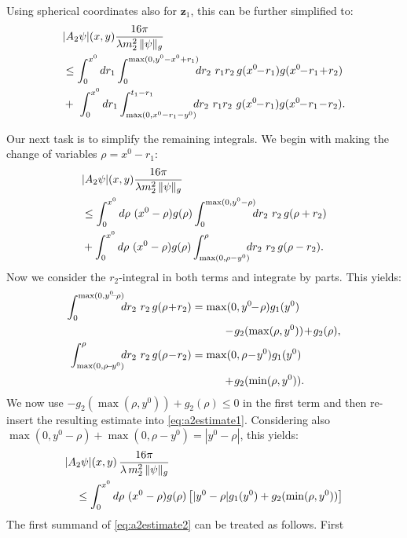 \documentclass[b5paper,draft,openbib,12pt]{memoir}
\newcommand{\vz}{\mathbf{z}}
\begin{document}
Using spherical coordinates also for $\vz_1$, this can be further simplified 
to:
\begin{align}
  &|A_2 \psi|(x,y)  \frac{16\pi}{\lambda  m_2^2 \, \| \psi \|_g} \notag\\
  &\leq  \int_0^{x^0} d r_1 \int_0^{\max(0,y^0-x^0+r_1)} \!\!\! dr_2~r_1 r_2\,g(x^0\!\!-\!r_1) g(x^0\!\!-\!r_1\!+\!r_2)\label{eq:A2firstestimate}\\
&+~\int_0^{x^0} d r_1 \int_{\max( 0,x^0-r_1-y^0)}^{t_1-r_1} \!\!\! dr_2~r_1 r_2 ~ g(x^0\!\!-\!r_1) g(x^0\!\!-\!r_1\!-\!r_2) \label{eq:A2secondestimate}.
\end{align}

Our next task is to simplify the remaining integrals. We begin with making 
the change of variables $\rho = x^0-r_1$:
\begin{align}
  &|A_2 \psi|(x,y)  \frac{16\pi}{\lambda  m_2^2 \, \| \psi \|_g} \notag\\
&\leq  \int_0^{x^0} d \rho~(x^0-\rho) g(\rho) \int_0^{\max(0,y^0-\rho)} \!\!\! dr_2~r_2\, g(\rho+r_2)\nonumber\\
&+\int_0^{x^0} d \rho~(x^0-\rho)g(\rho) \int_{\max( 0,\rho-y^0)}^{\rho} \!\!\! dr_2~r_2 \, g(\rho-r_2).
\label{eq:a2estimate1}
\end{align}
Now we consider the $r_2$-integral in both terms and integrate by parts. 
This yields:
\begin{align}
   \int_0^{\max(0,y^0\!\!-\!\rho)} \!\!\! dr_2~r_2\, g(\rho\!+\!r_2)
   &=\max(0,y^0\!\!-\!\rho) g_1(y^0) \notag\\
   &\quad \quad \quad \!-\! g_2(\max(\rho,y^0)) \!+\! g_2(\rho),\\
\int_{\max( 0,\rho\!-\!y^0)}^{\rho} \!\!\! dr_2~r_2 \, g(\rho\!-\!r_2) \notag
&= \max( 0,\rho\!-\!y^0) g_1(y^0) \\
&\quad\quad  \quad \!+\! g_2(\min(\rho,y^0)).
\end{align}
We now use $- g_2(\max(\rho,y^0)) + g_2(\rho) \leq 0$ in the first term and 
then re-insert the resulting estimate into \eqref{eq:a2estimate1}. 
Considering also $\max(0,y^0-\rho) + \max( 0,\rho-y^0) = |y^0-\rho|$, this 
yields:
\begin{align}
  &|A_2 \psi|(x,y) \, \frac{16\pi}{\lambda \, m_2^2 \, \| \psi \|_g}\notag\\
  &\quad \leq  \int_0^{x^0} d \rho~(x^0-\rho) g(\rho) \left[|y^0-\rho| g_1(y^0) + g_2(\min(\rho,y^0)) \right]
\label{eq:a2estimate2}
\end{align}
The first summand of \eqref{eq:a2estimate2} can be treated as follows. First 
\end{document}
